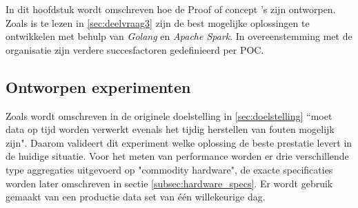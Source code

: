 


In dit hoofdstuk wordt omschreven hoe de Proof of concept 's zijn ontworpen. Zoals is te lezen in \ref{sec:deelvraag3} zijn de best mogelijke oplossingen te ontwikkelen met behulp van \textit{Golang} en \textit{Apache Spark}. In overeenstemming met de organisatie zijn verdere succesfactoren gedefinieerd per POC.




\subsection{Ontworpen experimenten}

Zoals wordt omschreven in de originele doelstelling in \ref{sec:doelstelling} ``moet data op tijd worden verwerkt evenals het tijdig herstellen van fouten mogelijk zijn".  Daarom valideert dit experiment welke oplossing de beste prestatie levert in de huidige situatie. Voor het meten van performance worden er drie verschillende type aggregaties uitgevoerd op "commodity hardware", de exacte specificaties worden later omschreven in sectie \ref{subsec:hardware_specs}.  Er wordt gebruik gemaakt van een productie data set van één willekeurige dag.


